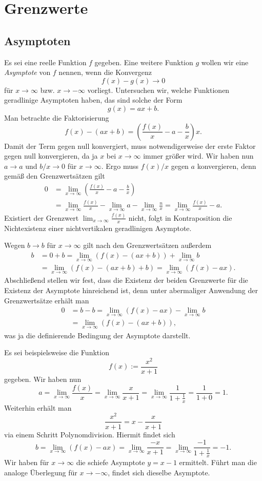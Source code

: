 
\chapter{Grenzwerte}

\section{Asymptoten}

Es sei eine reelle Funktion $f$ gegeben. Eine weitere Funktion $g$
wollen wir eine \emph{Asymptote}
von $f$ nennen, wenn die Konvergenz
\[f(x)-g(x)\to 0\]
für $x\to\infty$ bzw. $x\to -\infty$ vorliegt. Untersuchen wir,
welche Funktionen geradlinige Asymptoten haben, das sind solche
der Form
\[g(x) = ax + b.\]
Man betrachte die Faktorisierung
\[f(x) - (ax + b) = \left(\frac{f(x)}{x}-a-\frac{b}{x}\right)x.\]
Damit der Term gegen null konvergiert, muss notwendigerweise der erste
Faktor gegen null konvergieren, da ja $x$ bei $x\to\infty$ immer größer
wird. Wir haben nun $a\to a$ und $b/x\to 0$ für $x\to\infty$.
Ergo muss $f(x)/x$ gegen $a$ konvergieren, denn gemäß den
Grenzwertsätzen gilt
\begin{align*}
0 &= \lim_{x\to\infty}\left(\frac{f(x)}{x}-a-\frac{b}{x}\right)\\
&= \lim_{x\to\infty}\frac{f(x)}{x}-\lim_{x\to\infty}a-\lim_{x\to\infty}\frac{n}{x}
= \lim_{x\to\infty}\frac{f(x)}{x} - a.
\end{align*}
Existiert der Grenzwert $\lim_{x\to\infty}\frac{f(x)}{x}$ nicht,
folgt in Kontraposition die Nichtexistenz einer nichtvertikalen
geradlinigen Asymptote.

Wegen $b\to b$ für $x\to\infty$ gilt nach den Grenzwertsätzen außerdem
\begin{align*}
b &= 0 + b = \lim_{x\to\infty}(f(x) - (ax + b)) + \lim_{x\to\infty}b\\
&= \lim_{x\to\infty} (f(x) - (ax + b) + b) = \lim_{x\to\infty} (f(x) - ax).
\end{align*}
Abschließend stellen wir fest, dass die Existenz der beiden Grenzwerte
für die Existenz der Asymptote hinreichend ist, denn unter
abermaliger Anwendung der Grenzwertsätze erhält man
\begin{align*}
0 &= b-b = \lim_{x\to\infty}(f(x)-ax) - \lim_{x\to\infty} b\\
&= \lim_{x\to\infty} (f(x)-(ax+b)),
\end{align*}
was ja die definierende Bedingung der Asymptote darstellt.

 Es sei beispielsweise die Funktion
\[f(x) := \frac{x^2}{x+1}\]
gegeben. Wir haben nun
\[a = \lim_{x\to\infty}\frac{f(x)}{x} = \lim_{x\to\infty}\frac{x}{x+1}
= \lim_{x\to\infty}\frac{1}{1+\tfrac{1}{x}} = \frac{1}{1+0} = 1.\]
Weiterhin erhält man
\[\frac{x^2}{x+1} = x-\frac{x}{x+1}\]
via einem Schritt Polynomdivision. Hiermit findet sich
\[b = \lim_{x\to\infty} (f(x) - ax) = \lim_{x\to\infty} \frac{-x}{x+1}
= \lim_{x\to\infty}\frac{-1}{1+\tfrac{1}{x}} = -1.\]
Wir haben für $x\to\infty$ die schiefe Asymptote $y = x-1$
ermittelt. Führt man die analoge Überlegung für $x\to -\infty$,
findet sich dieselbe Asymptote.

